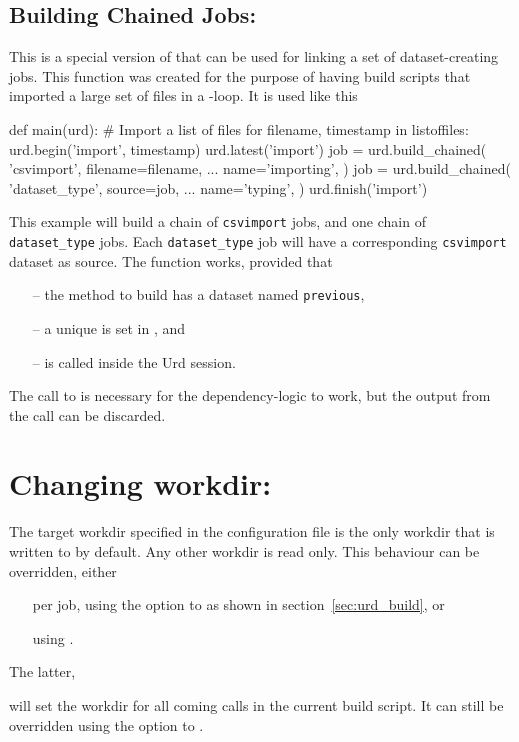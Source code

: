 \subsection{Building Chained Jobs: }
This is a special version of  that can be used for
linking a set of dataset-creating jobs.  This function was created for
the purpose of having build scripts that imported a large set of files
in a -loop.  It is used like this
\begin{python}
def main(urd):
    # Import a list of files
    for filename, timestamp in listoffiles:
        urd.begin('import', timestamp)
        urd.latest('import')
        job = urd.build_chained(
            'csvimport',
            filename=filename,
            ...
            name='importing',
        )
        job = urd.build_chained(
            'dataset_type',
            source=job,
            ...
            name='typing',
        )
        urd.finish('import')
\end{python}
This example will build a chain of \texttt{csvimport} jobs, and one
chain of \texttt{dataset\_type} jobs.  Each \texttt{dataset\_type} job
will have a corresponding \texttt{csvimport} dataset as source.
The  function works, provided that
\begin{itemize}
\item[--] the method to build has a dataset named \texttt{previous},
\item[--] a unique  is set in , and
\item[--]  is called inside the Urd session.
\end{itemize}
The call to  is necessary for the
dependency-logic to work, but the output from the call can be
discarded.





\section{Changing workdir:  }
\label{sec:set_workdir}
The target workdir specified in the configuration file is the only
workdir that is written to by default.  Any other workdir is read
only.  This behaviour can be overridden, either
\begin{itemize}
\item[] per job, using the  option to  as shown in section~\ref{sec:urd_build}, or
\item[] using .
\end{itemize}
The latter,
\begin{python}
def main(urd):
    urd.set_workdir(<workdir>)}
\end{python}
will set the workdir for all coming  calls in the
current build script.  It can still be overridden using
the  option to .





